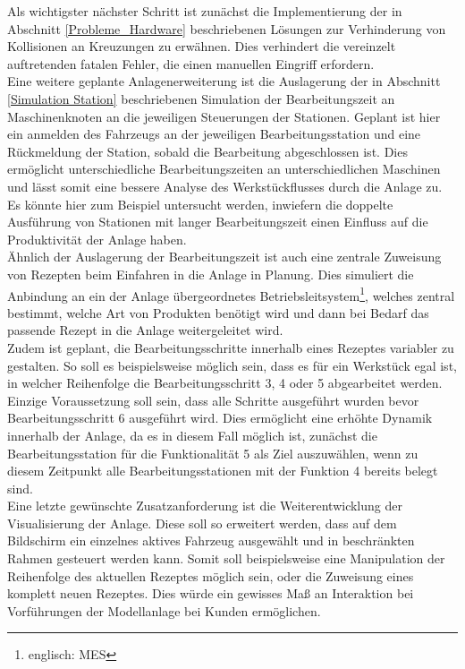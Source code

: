 	Als wichtigster nächster Schritt ist zunächst die Implementierung der in Abschnitt \ref{Probleme_Hardware} beschriebenen Lösungen zur Verhinderung von Kollisionen an Kreuzungen zu erwähnen. Dies verhindert die vereinzelt auftretenden fatalen Fehler, die einen manuellen Eingriff erfordern.\\
	Eine weitere  geplante Anlagenerweiterung ist die Auslagerung der in Abschnitt \ref{Simulation Station} beschriebenen Simulation der Bearbeitungszeit an Maschinenknoten an die jeweiligen Steuerungen der Stationen. Geplant ist hier ein anmelden des Fahrzeugs an der jeweiligen Bearbeitungsstation und eine Rückmeldung der Station, sobald die Bearbeitung abgeschlossen ist. Dies ermöglicht unterschiedliche Bearbeitungszeiten an unterschiedlichen Maschinen und lässt somit eine bessere Analyse des Werkstückflusses durch die Anlage zu. Es könnte hier zum Beispiel untersucht werden, inwiefern die doppelte Ausführung von Stationen mit langer Bearbeitungszeit einen Einfluss auf die Produktivität der Anlage haben.
	\\
	Ähnlich der Auslagerung der Bearbeitungszeit ist auch eine zentrale Zuweisung von Rezepten beim Einfahren in die Anlage in Planung. Dies simuliert die Anbindung an ein der Anlage übergeordnetes Betriebsleitsystem\footnote{englisch: \ac{MES}}, welches zentral bestimmt, welche Art von Produkten benötigt wird und dann bei Bedarf das passende Rezept in die Anlage weitergeleitet wird.
	\\
	Zudem ist geplant, die Bearbeitungsschritte innerhalb eines Rezeptes variabler zu gestalten. So soll es beispielsweise möglich sein, dass es für ein Werkstück egal ist, in welcher Reihenfolge die  Bearbeitungsschritt 3, 4 oder 5 abgearbeitet werden. Einzige Voraussetzung soll sein, dass alle Schritte ausgeführt wurden bevor Bearbeitungsschritt 6 ausgeführt wird. Dies ermöglicht eine erhöhte Dynamik innerhalb der Anlage, da es in diesem Fall möglich ist, zunächst die Bearbeitungsstation für die Funktionalität 5 als Ziel auszuwählen, wenn zu diesem Zeitpunkt alle Bearbeitungsstationen mit der Funktion 4 bereits belegt sind.
	\\
	Eine letzte gewünschte Zusatzanforderung ist die Weiterentwicklung der Visualisierung der Anlage. Diese soll so erweitert werden, dass auf dem Bildschirm ein einzelnes aktives Fahrzeug ausgewählt und in beschränkten Rahmen gesteuert werden kann. Somit soll beispielsweise eine Manipulation der Reihenfolge des aktuellen Rezeptes möglich sein, oder die Zuweisung eines komplett neuen Rezeptes. Dies würde ein gewisses Maß an Interaktion bei Vorführungen der Modellanlage bei Kunden ermöglichen.


